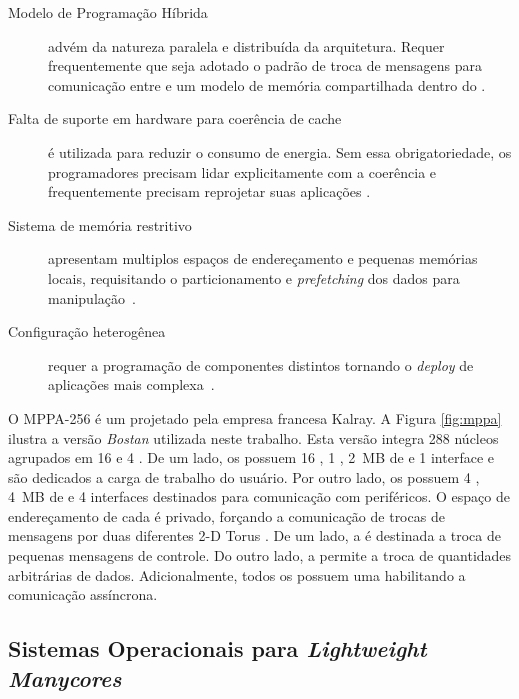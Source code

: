 	\begin{description}
		\item[Modelo de Programação Híbrida] advém da natureza paralela
			e distribuída da arquitetura. Requer frequentemente que seja
			adotado o padrão de troca de mensagens para comunicação entre
			\clusters e um modelo de memória compartilhada dentro do \cluster
			\cite{kelly2013}.

		\item[Falta de suporte em hardware para coerência de cache] é utilizada
			para reduzir o consumo de energia. Sem essa obrigatoriedade, os
			programadores precisam lidar explicitamente com a coerência
			e frequentemente precisam reprojetar suas aplicações
			\cite{francesquini2015}.

		\item[Sistema de memória restritivo] apresentam multiplos espaços de
			endereçamento e pequenas memórias locais, requisitando
			o particionamento e \textit{prefetching} dos dados para
			manipulação~\cite{Castro2016}.

		\item[Configuração heterogênea] requer a programação de componentes
			distintos tornando o \textit{deploy} de aplicações mais
			complexa~\cite{barbalace2015}.
	\end{description}

	O MPPA-256 é um \lw projetado pela empresa francesa Kalray. A Figura
	\ref{fig:mppa} ilustra a versão \textit{Bostan} utilizada neste trabalho.
	Esta versão integra 288 núcleos agrupados em 16 \cclusters e 4 \ioclusters.
	De um lado, os \cclusters possuem 16 \pe, 1 \rm, 2~MB de \sram e 1 interface
	\noc e são dedicados a carga de trabalho do usuário. Por outro lado, os
	\ioclusters possuem 4 \rms, 4~MB de \sram e 4 interfaces \noc destinados
	para comunicação com periféricos. O espaço de endereçamento de cada
	\cluster é privado, forçando a comunicação de trocas de mensagens por
	duas diferentes 2-D Torus \nocs. De um lado, a \cnoc é destinada a troca de
	pequenas mensagens de controle. Do outro lado, a \dnoc permite a troca de
	quantidades arbitrárias de dados. Adicionalmente, todos os \clusters
	possuem uma \dma habilitando a comunicação assíncrona.

\subsection{Sistemas Operacionais para \textit{Lightweight Manycores}}
\label{subsec:nanvix}

